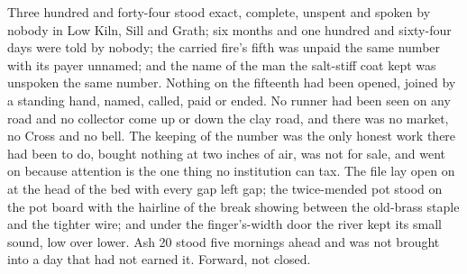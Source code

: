 Three hundred and forty-four stood exact, complete, unspent and spoken by nobody in Low Kiln, Sill and Grath; six months and one hundred and sixty-four days were told by nobody; the carried fire's fifth was unpaid the same number with its payer unnamed; and the name of the man the salt-stiff coat kept was unspoken the same number. Nothing on the fifteenth had been opened, joined by a standing hand, named, called, paid or ended. No runner had been seen on any road and no collector come up or down the clay road, and there was no market, no Cross and no bell. The keeping of the number was the only honest work there had been to do, bought nothing at two inches of air, was not for sale, and went on because attention is the one thing no institution can tax. The file lay open on  at the head of the bed with every gap left gap; the twice-mended pot stood on the pot board with the hairline of the break showing between the old-brass staple and the tighter wire; and under the finger's-width door the river kept its small sound, low over lower. Ash 20 stood five mornings ahead and was not brought into a day that had not earned it. Forward, not closed.
